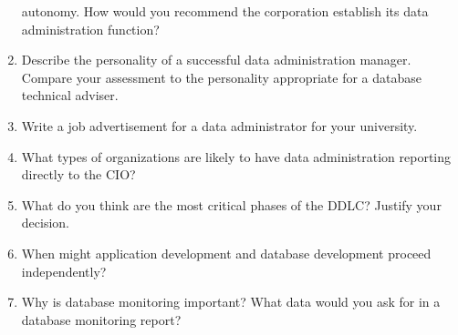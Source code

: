\documentclass[
]{article}
\begin{document}
\begin{enumerate}
  autonomy. How would you recommend the corporation establish its data
  administration function?
\item
  Describe the personality of a successful data administration
  manager. Compare your assessment to the personality appropriate for
  a database technical adviser.
\item
  Write a job advertisement for a data administrator for your
  university.
\item
  What types of organizations are likely to have data administration
  reporting directly to the CIO?
\item
  What do you think are the most critical phases of the DDLC? Justify
  your decision.
\item
  When might application development and database development proceed
  independently?
\item
  Why is database monitoring important? What data would you ask for in
  a database monitoring report?
\end{enumerate}
\end{document}

